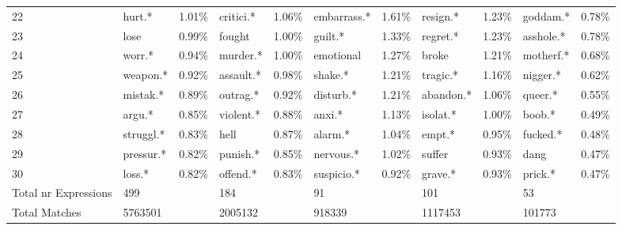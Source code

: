 \begin{tabular}{lllllllllll}
22                   &           hurt.* &     1.01\% &         critici.* &           1.06\% &  embarrass.* &     1.61\% &      resign.* &     1.23\% &         goddam.* &            0.78\% \\
23                   &             lose &     0.99\% &            fought &           1.00\% &      guilt.* &     1.33\% &      regret.* &     1.23\% &        asshole.* &            0.78\% \\
24                   &           worr.* &     0.94\% &          murder.* &           1.00\% &    emotional &     1.27\% &         broke &     1.21\% &        motherf.* &            0.68\% \\
25                   &         weapon.* &     0.92\% &         assault.* &           0.98\% &      shake.* &     1.21\% &      tragic.* &     1.16\% &         nigger.* &            0.62\% \\
26                   &         mistak.* &     0.89\% &          outrag.* &           0.92\% &    disturb.* &     1.21\% &     abandon.* &     1.06\% &          queer.* &            0.55\% \\
27                   &           argu.* &     0.85\% &         violent.* &           0.88\% &       anxi.* &     1.13\% &      isolat.* &     1.00\% &           boob.* &            0.49\% \\
28                   &        struggl.* &     0.83\% &              hell &           0.87\% &      alarm.* &     1.04\% &        empt.* &     0.95\% &         fucked.* &            0.48\% \\
29                   &        pressur.* &     0.82\% &          punish.* &           0.85\% &    nervous.* &     1.02\% &        suffer &     0.93\% &             dang &            0.47\% \\
30                   &           loss.* &     0.82\% &          offend.* &           0.83\% &   suspicio.* &     0.92\% &       grave.* &     0.93\% &          prick.* &            0.47\% \\
Total nr Expressions &              499 &            &               184 &                  &           91 &            &           101 &            &               53 &                   \\
Total Matches        &          5763501 &            &           2005132 &                  &       918339 &            &       1117453 &            &           101773 &                   \\
\bottomrule
\end{tabular}
